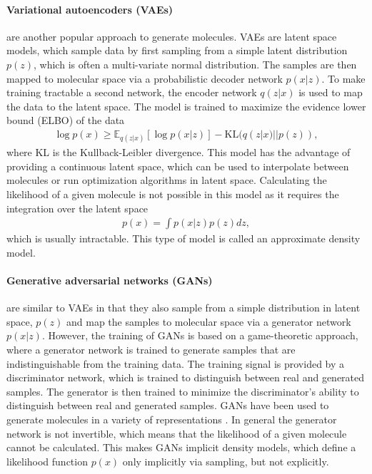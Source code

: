\paragraph{Variational autoencoders (VAEs)} are another popular approach to
generate molecules. VAEs are latent space models, which sample 
data by first sampling from a simple latent distribution $p(z)$, which is often 
a multi-variate normal distribution. The samples are then mapped to 
molecular space via a probabilistic decoder network $p(x|z)$.
To make training tractable a second network, the encoder network $q(z|x)$ is
used to map the data to the latent space. The model is trained to maximize
the evidence lower bound (ELBO) of the data
\begin{align}
    \log p(x) \geq \mathbb{E}_{q(z|x)}[\log p(x|z)] - \text{KL}(q(z|x) || p(z)), 
\end{align}
where KL is the Kullback-Leibler divergence. 
This model has the advantage of providing a continuous latent space, which can
be used to interpolate between molecules or run optimization algorithms in
latent space. Calculating the likelihood of a given molecule is not possible
in this model as it requires the integration over the latent space
\begin{align}
    p(x) = \int p(x|z) p(z) dz,
\end{align}
which is usually intractable. This type of model is called an approximate density model. 

\paragraph{Generative adversarial networks (GANs)} are similar to VAEs in that
they also sample from a simple distribution in latent space, $p(z)$ and map the samples to 
molecular space via a generator network $p(x|z)$.
However, the training of GANs is based on a game-theoretic approach, where a
generator network is trained to generate samples that are indistinguishable from
the training data. The training signal is provided by a discriminator network,
which is trained to distinguish between real and generated samples. The generator
is then trained to minimize the discriminator's ability to distinguish between
real and generated samples. GANs have been used to generate molecules 
in a variety of representations \citep{todo}. In general the generator network
is not invertible, which means that the likelihood of a given molecule cannot
be calculated. This makes GANs implicit density models, which define a 
likelihood function $p(x)$ only implicitly via sampling, but not explicitly.


